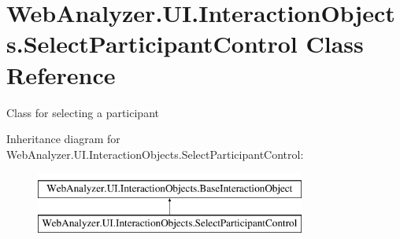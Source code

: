 \hypertarget{class_web_analyzer_1_1_u_i_1_1_interaction_objects_1_1_select_participant_control}{}\section{Web\+Analyzer.\+U\+I.\+Interaction\+Objects.\+Select\+Participant\+Control Class Reference}
\label{class_web_analyzer_1_1_u_i_1_1_interaction_objects_1_1_select_participant_control}


Class for selecting a participant  


Inheritance diagram for Web\+Analyzer.\+U\+I.\+Interaction\+Objects.\+Select\+Participant\+Control\+:\begin{figure}[H]
\begin{center}
\leavevmode
\includegraphics[height=2.000000cm]{class_web_analyzer_1_1_u_i_1_1_interaction_objects_1_1_select_participant_control}
\end{center}
\end{figure}
